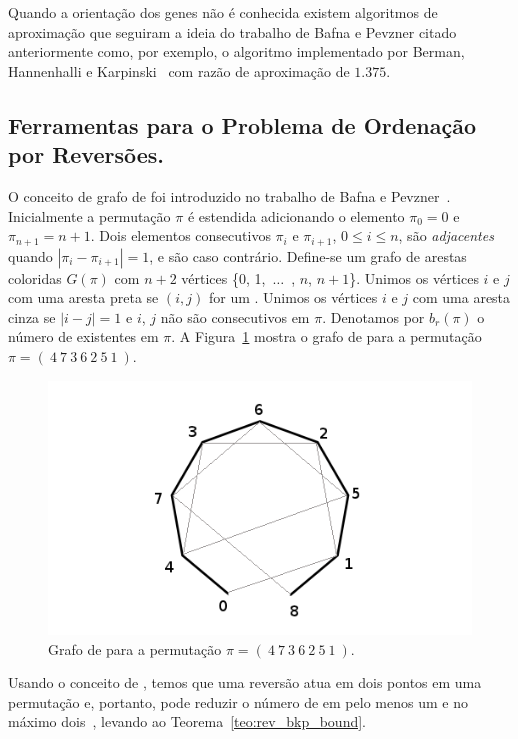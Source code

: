 Quando a orientação dos genes não é conhecida existem algoritmos de
aproximação que seguiram a ideia do trabalho de Bafna e Pevzner citado
anteriormente como, por exemplo, o algoritmo implementado por Berman,
Hannenhalli e Karpinski~\cite{BermanHannenhalliKarpinski*2002} com
razão de aproximação de $1.375$.

\subsection{Ferramentas para o Problema de Ordenação por Reversões.}
\label{subsec:toolrev}
O conceito de grafo de \bkp{} foi introduzido no trabalho de Bafna e
Pevzner~\cite{BafnaPevzner*1996}. Inicialmente a permutação $\pi$ é
estendida adicionando o elemento $\pi_{0} = 0$ e $\pi_{n+1} =
n+1$. Dois elementos consecutivos $\pi_{i}$ e $\pi_{i+1}$, $0 \le
i \le n$, são \textit{adjacentes} quando $|\pi_{i} - \pi_{i+1}| = 1$,
e são  caso contrário. Define-se um grafo de arestas
coloridas $G(\pi)$ com $n + 2$ vértices \{0, 1,~$\ldots$~, $n$, $n +
1$\}. Unimos os vértices $i$ e $j$ com uma aresta preta se $(i, j)$
for um . Unimos os vértices $i$ e $j$ com uma aresta
cinza se $|i - j| = 1$ e $i$, $j$ não são consecutivos em
$\pi$. Denotamos por $b_r(\pi)$ o número de \bkp{} existentes em
$\pi$. A Figura~\ref{fig:rev_grafo_bkp} mostra o grafo de \bkp{} para
a permutação $\pi = (~4~7~3~6~2~5~1~)$.

\begin{figure}[h]
  \centering 
  \includegraphics[scale=0.6]{images/rev_grafo_bkp.png} 
  \caption{Grafo de \bkp{} para a permutação $\pi = (~4~7~3~6~2~5~1~)$.}
  \label{fig:rev_grafo_bkp}
\end{figure}

Usando o conceito de \bkp{}, temos que uma reversão atua em dois
pontos em uma permutação e, portanto, pode reduzir o número de \bkp{}
em pelo menos um e no máximo dois~\cite{BafnaPevzner*1996}, levando ao
Teorema~\ref{teo:rev_bkp_bound}. 

